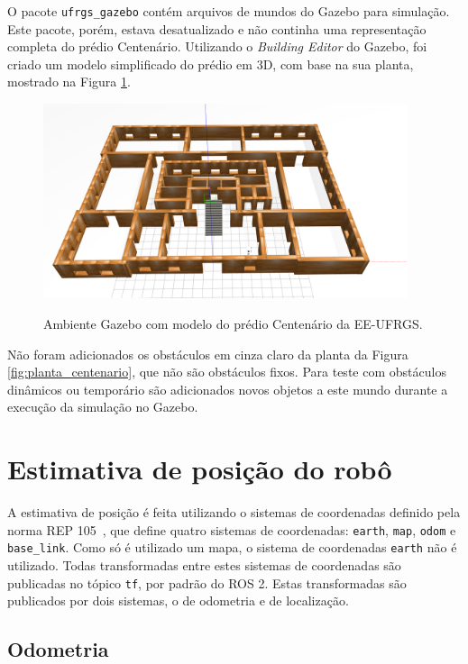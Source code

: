 \documentclass[repeatfields,xlists,xpacks,oneside,yearsonly]{ufrgscca}
\begin{document}
O pacote \texttt{ufrgs\_gazebo} contém arquivos de mundos do Gazebo
para simulação. Este pacote, porém, estava desatualizado e não
continha uma representação completa do prédio Centenário. Utilizando
o \textit{Building Editor} do Gazebo, foi criado um modelo
simplificado do prédio em 3D, com base na sua planta, mostrado na
Figura \ref{fig:gazebo_centenario}.

\begin{figure}[h]
    {
        \centering
        \caption{Ambiente Gazebo com modelo do prédio Centenário da EE-UFRGS.}
        \label{fig:gazebo_centenario}
        \includegraphics[width=0.95\textwidth]{gazebo.png}\\
    }
\end{figure}

Não foram adicionados os obstáculos em cinza claro da planta da
Figura \ref{fig:planta_centenario}, que não são obstáculos fixos.
Para teste com obstáculos dinâmicos ou temporário são adicionados
novos objetos a este mundo durante a execução da simulação no Gazebo.

\section{Estimativa de posição do robô}

A estimativa de posição é feita utilizando o sistemas de coordenadas
definido pela norma REP 105~\cite{rep_105}, que define quatro
sistemas de coordenadas: \texttt{earth}, \texttt{map}, \texttt{odom}
e \texttt{base\_link}. Como só é utilizado um mapa, o sistema de
coordenadas \texttt{earth} não é utilizado. Todas transformadas entre
estes sistemas de coordenadas são publicadas no tópico \texttt{tf},
por padrão do ROS 2. Estas transformadas são publicados por dois
sistemas, o de odometria e de localização.

\subsection{Odometria}
\label{met:odometria}
\end{document}
